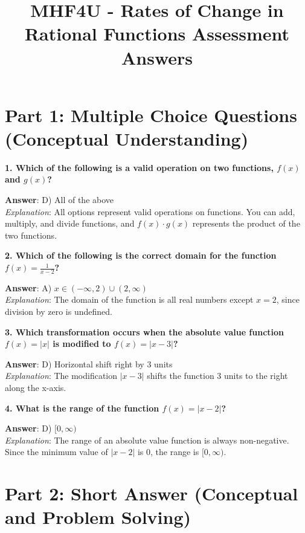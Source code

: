 \documentclass{article}
\title{MHF4U - Rates of Change in Rational Functions Assessment Answers}
\author{}
\date{}
\begin{document}
\maketitle

\section*{Part 1: Multiple Choice Questions (Conceptual Understanding)}

\textbf{1. Which of the following is a valid operation on two functions, \( f(x) \) and \( g(x) \)?}

\textbf{Answer}: D) All of the above \\
\textit{Explanation}: All options represent valid operations on functions. You can add, multiply, and divide functions, and \( f(x) \cdot g(x) \) represents the product of the two functions.

\bigskip

\textbf{2. Which of the following is the correct domain for the function \( f(x) = \frac{1}{x - 2} \)?}

\textbf{Answer}: A) \( x \in (-\infty, 2) \cup (2, \infty) \) \\
\textit{Explanation}: The domain of the function is all real numbers except \( x = 2 \), since division by zero is undefined.

\bigskip

\textbf{3. Which transformation occurs when the absolute value function \( f(x) = |x| \) is modified to \( f(x) = |x - 3| \)?}

\textbf{Answer}: D) Horizontal shift right by 3 units \\
\textit{Explanation}: The modification \( |x - 3| \) shifts the function 3 units to the right along the x-axis.

\bigskip

\textbf{4. What is the range of the function \( f(x) = |x - 2| \)?}

\textbf{Answer}: D) \( [0, \infty) \) \\
\textit{Explanation}: The range of an absolute value function is always non-negative. Since the minimum value of \( |x - 2| \) is 0, the range is \( [0, \infty) \).

\newpage

\section*{Part 2: Short Answer (Conceptual and Problem Solving)}
\end{document}

